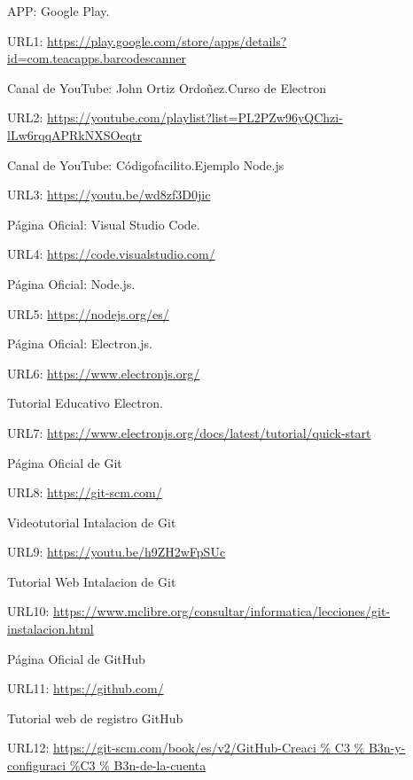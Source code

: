 

\hypertarget{linkapp}{APP: Google Play.}

\parbox {15cm} { \raggedright URL1: \url{https://play.google.com/store/apps/details?id=com.teacapps.barcodescanner} }


\hypertarget{CURSOELECTRON}{Canal de YouTube: John Ortiz Ordoñez.Curso de Electron}

\parbox {15cm} { \raggedright URL2: \url{https://youtube.com/playlist?list=PL2PZw96yQChzi-lLw6rqqAPRkNXSOeqtr}}

\hypertarget{NODE2}{Canal de YouTube: Códigofacilito.Ejemplo Node.js}

URL3: \url{https://youtu.be/wd8zf3D0jic}

\hypertarget{code}{Página Oficial: Visual Studio Code.}

URL4: \url{https://code.visualstudio.com/}

\hypertarget{node1}{Página Oficial: Node.js.}

URL5: \url{https://nodejs.org/es/}

\hypertarget{oficialpagina}{Página Oficial: Electron.js.}

URL6: \url{https://www.electronjs.org/}

\hypertarget{tutorial}{Tutorial Educativo Electron.}

URL7: \url{https://www.electronjs.org/docs/latest/tutorial/quick-start}

\hypertarget{git}{Página Oficial de Git}

URL8: \url{https://git-scm.com/}

\hypertarget{videogit}{Videotutorial Intalacion de Git}

URL9: \url{https://youtu.be/h9ZH2wFpSUc}

\hypertarget{texgit}{Tutorial Web Intalacion de Git}

\parbox {15cm} { \raggedright URL10: \url{https://www.mclibre.org/consultar/informatica/lecciones/git-instalacion.html} }

\hypertarget{github}{Página Oficial de GitHub}

URL11: \url{https://github.com/}

\hypertarget{tutogithubt}{Tutorial web de registro GitHub}

\parbox {15cm} { \raggedright URL12: \url{https://git-scm.com/book/es/v2/GitHub-Creaci \% C3 \% B3n-y-configuraci \%C3 \% B3n-de-la-cuenta} }






